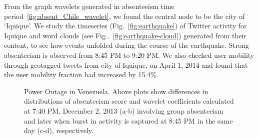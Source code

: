 From the graph wavelets generated in absenteeism time period~\ref{fig:absent_Chile_wavelet}, we found the central node to be the city of `Iquique'.
We study the timeseries (Fig.~\ref{fig:earthquake}) of Twitter activity for Iquique and word clouds (see Fig..~\ref{fig:earthquake-cloud}) generated from their content, to see how events unfolded during the course of the earthquake.
Strong absenteeism is observed from 8:45 PM to 9:20 PM. We also checked  user mobility through geotagged tweets from city of Iquique, on April 1, 2014 and found that the user mobility fraction had increased by 15.4\%.

\begin{figure}[t]
	\centering
    \vspace{-2mm}
	\caption{Power Outage in Venezuela. Above plots show differences in distributions of absenteeism score and wavelet coefficients calculated at 7:40 PM, December 2, 2013 (a-b) involving group absenteeism and later when burst in activity is captured at 8:45 PM in the same day (c-d), respectively.}
\label{fig:case2_wavelet}
\end{figure}


